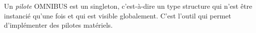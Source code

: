 





Un \emph{pilote} OMNIBUS est un singleton, c'est-à-dire un type structure qui n'est être instancié qu'une fois et qui est visible globalement. C'est l'outil qui permet d'implémenter des pilotes matériels.





